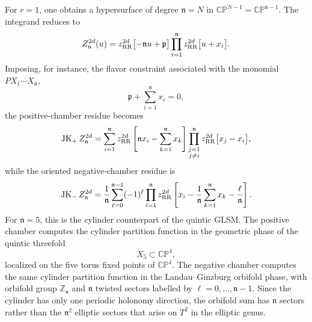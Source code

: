 \documentclass[11pt,a4paper]{article}
\numberwithin{equation}{section}
\theoremstyle{plain}
\theoremstyle{definition}
\theoremstyle{remark}
\begin{document}
For \(r=1\), one obtains a hypersurface of degree \(\mathfrak n=N\) in \(\mathbb{CP}^{N-1}=\mathbb{CP}^{\mathfrak n-1}\). The integrand reduces to
\begin{equation}
Z_{\mathfrak n}^{2d}(u)
=
z_{\rm RR}^{2d}\bigl[-\mathfrak n u+\mathfrak p\bigr]
\prod_{i=1}^{\mathfrak n}
z_{\rm RR}^{2d}\bigl[u+x_i\bigr].
\end{equation}
Imposing, for instance, the flavor constraint associated with the monomial \(PX_1\cdots X_{\mathfrak n}\),
\begin{equation}
\mathfrak p+\sum_{i=1}^{\mathfrak n}x_i=0,
\end{equation}
the positive-chamber residue becomes
\begin{equation}
\operatorname{JK}_{+}Z_{\mathfrak n}^{2d}
=
\sum_{i=1}^{\mathfrak n}
z_{\rm RR}^{2d}
\left[
\mathfrak n x_i-\sum_{k=1}^{\mathfrak n}x_k
\right]
\prod_{\substack{j=1\\ j\neq i}}^{\mathfrak n}
z_{\rm RR}^{2d}\bigl[x_j-x_i\bigr],
\end{equation}
while the oriented negative-chamber residue is
\begin{equation}
\operatorname{JK}_{-}Z_{\mathfrak n}^{2d}
=
\frac{1}{\mathfrak n}
\sum_{\ell=0}^{\mathfrak n-1}(-1)^{\ell}
\prod_{i=1}^{\mathfrak n}
z_{\rm RR}^{2d}
\left[
x_i-\frac{1}{\mathfrak n}\sum_{k=1}^{\mathfrak n}x_k-\frac{\ell}{\mathfrak n}
\right].
\label{eq:ci-JK-minus-hypersurface}
\end{equation}
For \(\mathfrak n=5\), this is the cylinder counterpart of the quintic GLSM. The positive chamber computes the cylinder partition function in the geometric phase of the quintic threefold
\begin{equation}
X_5\subset \mathbb{CP}^4,
\end{equation}
localized on the five torus fixed points of \(\mathbb{CP}^4\). The negative chamber computes the same cylinder partition function in the Landau--Ginzburg orbifold phase, with orbifold group \(\mathbb Z_{\mathfrak n}\) and \(\mathfrak n\) twisted sectors labelled by \(\ell=0,\ldots,\mathfrak n-1\). Since the cylinder has only one periodic holonomy direction, the orbifold sum has \(\mathfrak n\) sectors rather than the \(\mathfrak n^2\) elliptic sectors that arise on \(T^2\) in the elliptic genus.
\end{document}
